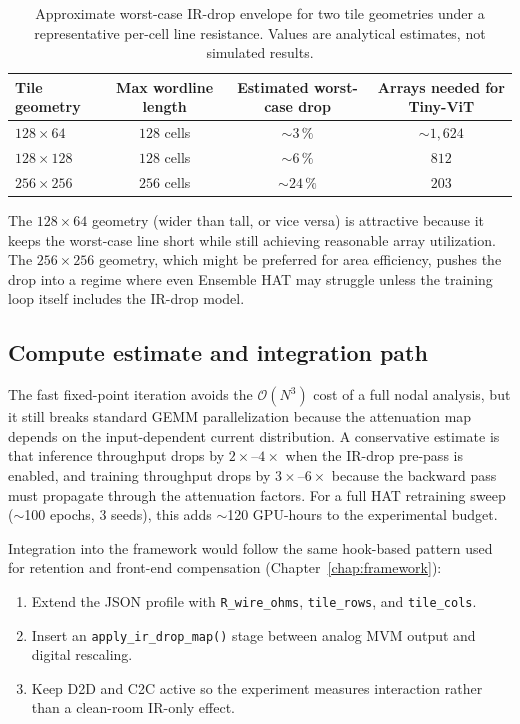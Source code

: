 \begin{table}[ht]
    \centering
    \caption{Approximate worst-case IR-drop envelope for two tile geometries under a representative per-cell line resistance.  Values are analytical estimates, not simulated results.}
    \label{tab:ir-drop-geometry}
    \small
    \setlength{\tabcolsep}{6pt}
    \begin{tabular}{@{}lccc@{}}
        \toprule
        Tile geometry & Max wordline length & Estimated worst-case drop & Arrays needed for Tiny-ViT \\
        \midrule
        $128 \times 64$  & $128$ cells & $\sim$$3\,\%$  & $\sim$$1{,}624$ \\
        $128 \times 128$ & $128$ cells & $\sim$$6\,\%$  & $812$ \\
        $256 \times 256$ & $256$ cells & $\sim$$24\,\%$ & $203$ \\
        \bottomrule
    \end{tabular}
\end{table}

The $128 \times 64$ geometry (wider than tall, or vice versa) is attractive because it keeps the worst-case line short while still achieving reasonable array utilization.  The $256 \times 256$ geometry, which might be preferred for area efficiency, pushes the drop into a regime where even Ensemble HAT may struggle unless the training loop itself includes the IR-drop model.

\subsection{Compute estimate and integration path}

The fast fixed-point iteration avoids the $\mathcal{O}(N^{3})$ cost of a full nodal analysis, but it still breaks standard GEMM parallelization because the attenuation map depends on the input-dependent current distribution.  A conservative estimate is that inference throughput drops by $2\times$--$4\times$ when the IR-drop pre-pass is enabled, and training throughput drops by $3\times$--$6\times$ because the backward pass must propagate through the attenuation factors.  For a full HAT retraining sweep ($\sim$100 epochs, $3$ seeds), this adds $\sim$120 GPU-hours to the experimental budget.

Integration into the framework would follow the same hook-based pattern used for retention and front-end compensation (Chapter~\ref{chap:framework}):
\begin{enumerate}
    \item Extend the JSON profile with \texttt{R\_wire\_ohms}, \texttt{tile\_rows}, and \texttt{tile\_cols}.
    \item Insert an \texttt{apply\_ir\_drop\_map()} stage between analog MVM output and digital rescaling.
    \item Keep D2D and C2C active so the experiment measures interaction rather than a clean-room IR-only effect.
\end{enumerate}

